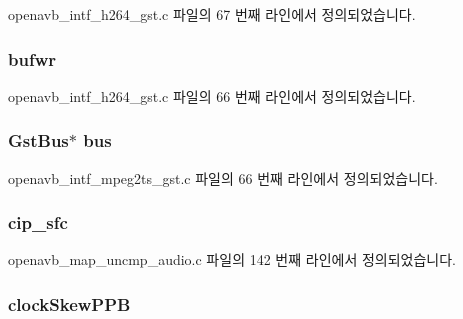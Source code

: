 openavb\+\_\+intf\+\_\+h264\+\_\+gst.\+c 파일의 67 번째 라인에서 정의되었습니다.

\subsubsection[{\texorpdfstring{bufwr}{bufwr}}]{ bufwr}\hypertarget{structpvt__data__t_a6e3073aaafcbd8710b961fb5c6abaa37}{}\label{structpvt__data__t_a6e3073aaafcbd8710b961fb5c6abaa37}


openavb\+\_\+intf\+\_\+h264\+\_\+gst.\+c 파일의 66 번째 라인에서 정의되었습니다.

\subsubsection[{\texorpdfstring{bus}{bus}}]{\setlength{\rightskip}{0pt plus 5cm}Gst\+Bus$\ast$ bus}\hypertarget{structpvt__data__t_a8069191ff53f2617a832b3ae528ef11d}{}\label{structpvt__data__t_a8069191ff53f2617a832b3ae528ef11d}


openavb\+\_\+intf\+\_\+mpeg2ts\+\_\+gst.\+c 파일의 66 번째 라인에서 정의되었습니다.

\subsubsection[{\texorpdfstring{cip\+\_\+sfc}{cip_sfc}}]{ cip\+\_\+sfc}\hypertarget{structpvt__data__t_a0b64d32347a2d5e31675b5eca666a953}{}\label{structpvt__data__t_a0b64d32347a2d5e31675b5eca666a953}


openavb\+\_\+map\+\_\+uncmp\+\_\+audio.\+c 파일의 142 번째 라인에서 정의되었습니다.

\subsubsection[{\texorpdfstring{clock\+Skew\+P\+PB}{clockSkewPPB}}]{ clock\+Skew\+P\+PB}\hypertarget{structpvt__data__t_a6d2532ea1bdd6efc2c3169f155371167}{}\label{structpvt__data__t_a6d2532ea1bdd6efc2c3169f155371167}


